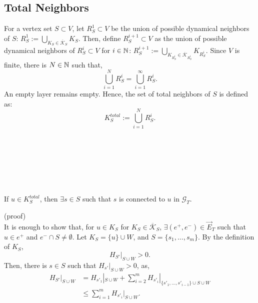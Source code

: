 \documentclass{comnet}%
\begin{document}
\subsection{\label{appsub:Total_neighbors} Total Neighbors}
For a vertex set $S \subset V$, let $R^{1}_{S} \subset V$ be the union of possible dynamical neighbors of $S$: $R^{1}_{S} := \bigcup_{K_{S} \in \overline{\mathcal{K}}_{S}} K_{S}$. Then, define $R^{i+1}_{S} \subset V$ as the union of possible dynamical neighbors of $R^{i}_{S} \subset V$ for $i \in \Bbb N$: $R^{i+1}_{S} := \bigcup_{K_{R^{i}_{S}} \in \overline{\mathcal{K}}_{R^{i}_{S}}} K_{R^{i}_{S}}$. Since $V$ is finite, there is $N \in \Bbb N$ such that,
\begin{equation}
	\bigcup_{i=1}^{N} R^{i}_{S} = \bigcup_{i=1}^{\infty} R^{i}_{S}.
\end{equation}
An empty layer remains empty. Hence, the set of total neighbors of $S$ is defined as:
\begin{equation}
	K^{total}_{S} := \bigcup_{i=1}^{N} R^{i}_{S}.
\end{equation}
\quad \\ \quad \\ \quad \\ \quad \\ \quad \\ \quad \\
\begin{lemma}
	If $u \in K^{total}_{S}$, then $\exists s \in S$ such that $s$ is connected to $u$ in $\mathcal{G}_{T}$.
	\label{lemma:In_Total_Neighbors}\end{lemma}
(proof)\\
It is enough to show that, for $u \in K_{S}$ for $K_{S} \in \overline{\mathcal{K}}_{S}$, $\exists (e^{+}, e^{-}) \in \overrightarrow{E}_{T}$ such that $u \in e^{+}$ and $e^{-} \cap S \not= \emptyset$. Let $K_{S} = \{ u \} \cup W$, and $S = \{ s_1, \dots, s_m \}$. By the definition of $K_{S}$, 
\begin{equation}
	H_{S'}|_{S \cup W} > 0.
\end{equation}
Then, there is $s \in S$ such that $H_{s'}|_{S \cup W} > 0$, as,
\begin{equation}\begin{aligned}
		H_{S'}|_{S \cup W} &= H_{s'_{1}}|_{S \cup W} + \sum_{i=2}^{m} H_{s'_{i}}|_{\{s'_{1}, \dots, s'_{i-1}\} \cup S \cup W}\\
		&\leqslant \sum_{i=1}^{m} H_{s'_{i}}|_{S \cup W}.
\end{aligned}\end{equation}
\end{document}
